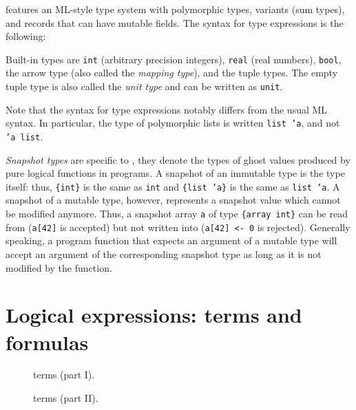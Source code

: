 \whyml features an ML-style type system with polymorphic types,
variants (sum types), and records that can have mutable fields.
The syntax for type expressions is the following:
\begin{center}\end{center}
Built-in types are \texttt{int} (arbitrary precision integers),
\texttt{real} (real numbers), \texttt{bool}, the arrow type
(also called the \textit{mapping type}),
and the tuple types.
The empty tuple type is also called the \textit{unit type}
and can be written as \texttt{unit}.

Note that the syntax for type expressions notably differs from
the usual ML syntax. In particular, the type of polymorphic lists
is written \texttt{list 'a}, and not \texttt{'a list}.

\textit{Snapshot types} are specific to \whyml, they denote
the types of ghost values produced by pure logical functions in
\whyml programs. A snapshot of an immutable type is the type
itself: thus, \texttt{\{int\}} is the same as \texttt{int} and
\texttt{\{list 'a\}} is the same as \texttt{list 'a}.
A snapshot of a mutable type, however, represents a snapshot
value which cannot be modified anymore. Thus, a snapshot array
\texttt{a} of type \texttt{\{array int\}} can be read from
(\texttt{a[42]} is accepted) but not written into
(\texttt{a[42] <- 0} is rejected). Generally speaking,
a program function that expects an argument of a mutable type
will accept an argument of the corresponding snapshot type
as long as it is not modified by the function.

\section{Logical expressions: terms and formulas}
\label{sec:terms}

\begin{figure}[p!]
\begin{center}\end{center}
\caption{\whyml terms (part I).}
\label{fig:bnf:term1}
\end{figure}

\begin{figure}[ht]
\begin{center}\end{center}
\caption{\whyml terms (part II).}
\label{fig:bnf:term2}
\end{figure}

